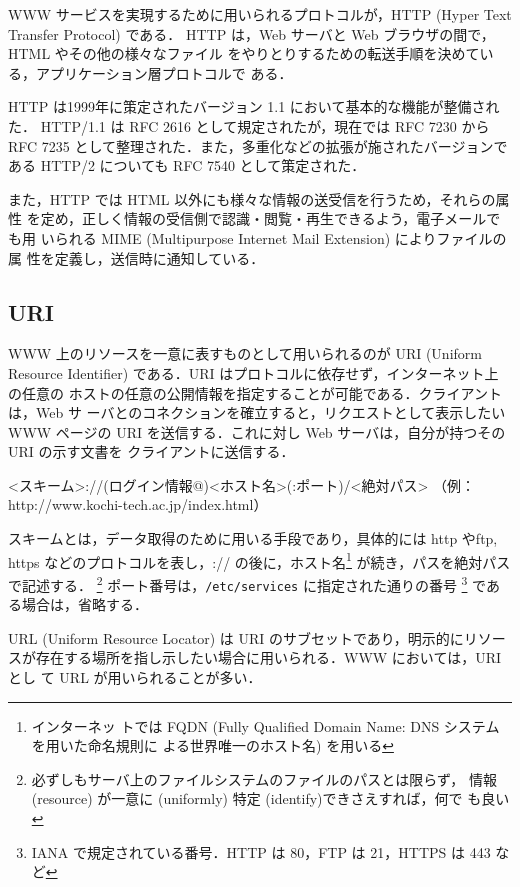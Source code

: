 WWW サービスを実現するために用いられるプロトコルが，HTTP (Hyper Text
Transfer Protocol) である．
HTTP は，Web サーバと Web ブラウザの間で，HTML やその他の様々なファイル
をやりとりするための転送手順を決めている，アプリケーション層プロトコルで
ある．

HTTP は1999年に策定されたバージョン 1.1 において基本的な機能が整備された．
HTTP/1.1 は RFC 2616 として規定されたが，現在では RFC 7230 から RFC 7235 
として整理された．また，多重化などの拡張が施されたバージョンである HTTP/2 
についても RFC 7540 として策定された．

また，HTTP では HTML 以外にも様々な情報の送受信を行うため，それらの属性
を定め，正しく情報の受信側で認識・閲覧・再生できるよう，電子メールでも用
いられる MIME (Multipurpose Internet Mail Extension) によりファイルの属
性を定義し，送信時に通知している．

\subsection{URI}
WWW 上のリソースを一意に表すものとして用いられるのが URI (Uniform Resource 
Identifier) である．URI はプロトコルに依存せず，インターネット上の任意の
ホストの任意の公開情報を指定することが可能である．クライアントは，Web サ
ーバとのコネクションを確立すると，リクエストとして表示したい WWW ページの
 URI を送信する．これに対し Web サーバは，自分が持つその URI の示す文書を
クライアントに送信する．

\begin{cli}
 <スキーム>://(ログイン情報@)<ホスト名>(:ポート)/<絶対パス>
 （例： http://www.kochi-tech.ac.jp/index.html）
\end{cli}

スキームとは，データ取得のために用いる手段であり，具体的には http やftp,
https などのプロトコルを表し，:// の後に，ホスト名\footnote{インターネッ
トでは FQDN (Fully Qualified Domain Name: DNS システムを用いた命名規則に
よる世界唯一のホスト名) を用いる} が続き，パスを絶対パスで記述する．
\footnote{必ずしもサーバ上のファイルシステムのファイルのパスとは限らず，
情報(resource) が一意に (uniformly) 特定 (identify)できさえすれば，何で
も良い} ポート番号は，\texttt{/etc/services} に指定された通りの番号
\footnote{IANA で規定されている番号．HTTP は 80，FTP は 21，HTTPS は 443 
など} である場合は，省略する．

URL (Uniform Resource Locator) は URI のサブセットであり，明示的にリソー
スが存在する場所を指し示したい場合に用いられる．WWW においては，URI とし
て URL が用いられることが多い．

